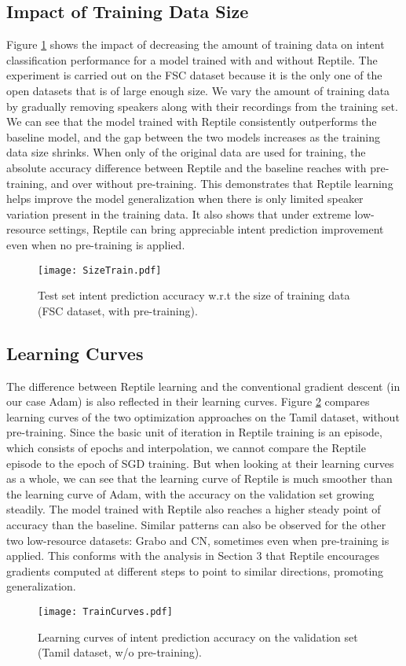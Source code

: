 \documentclass[a4paper]{article}
\begin{document}
	
	\subsection{Impact of Training Data Size}
	Figure \ref{fig:trainsize} shows the impact of decreasing the amount of training data on intent classification performance for a model trained with and without Reptile. The experiment is carried out on the FSC dataset because it is the only one of the open datasets that is of large enough size. We vary the amount of training data by gradually removing speakers along with their recordings from the training set. We can see that the model trained with Reptile consistently outperforms the baseline model, and the gap between the two models increases as the training data size shrinks. When only  of the original data are used for training, the absolute accuracy difference between Reptile and the baseline reaches  with pre-training, and over  without pre-training. This demonstrates that Reptile learning helps improve the model generalization when there is only limited speaker variation present in the training data. It also shows that under extreme low-resource settings, Reptile can bring appreciable intent prediction improvement even when no pre-training is applied.
	\begin{figure}
		\centering
		\texttt{[image: SizeTrain.pdf]}
		\caption{Test set intent prediction accuracy w.r.t the size of training data (FSC dataset, with pre-training).}
		\label{fig:trainsize}
	\end{figure}
	
	\subsection{Learning Curves}
	The difference between Reptile learning and the conventional gradient descent (in our case Adam) is also reflected in their learning curves. Figure \ref{fig:traincurve} compares learning curves of the two optimization approaches on the Tamil dataset, without pre-training. Since the basic unit of iteration in Reptile training is an episode, which consists of  epochs and  interpolation, we cannot compare the  Reptile episode to the  epoch of SGD training. But when looking at their learning curves as a whole, we can see that the learning curve of Reptile is much smoother than the learning curve of Adam, with the accuracy on the validation set growing steadily. The model trained with Reptile also reaches a higher steady point of accuracy than the baseline. Similar patterns can also be observed for the other two low-resource datasets: Grabo and CN, sometimes even when pre-training is applied. This conforms with the analysis in Section 3 that Reptile encourages gradients computed at different steps to point to similar directions, promoting generalization.
	\begin{figure}
		\centering
		\texttt{[image: TrainCurves.pdf]}
		\caption{Learning curves of intent prediction accuracy on the validation set (Tamil dataset, w/o pre-training).}
		\label{fig:traincurve}
	\end{figure}
	
\end{document}
